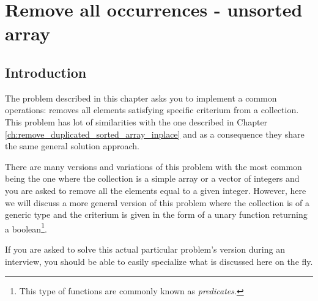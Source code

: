%



\chapter{Remove all occurrences -  unsorted array}
\label{ch:remove_all_occurrences_unsorted_array_inplace}
\section*{Introduction}
The problem described in this chapter asks you to implement a common operations: removes all
elements satisfying specific criterium from a collection. This problem has lot of similarities with
the one described in Chapter \ref{ch:remove_duplicated_sorted_array_inplace} and as a consequence
they share the same general solution approach. 

There are many versions and variations of this problem with the most common being the one where the
collection is a simple array or a vector of integers and you are asked to remove all the elements
equal to a given integer. However, here we will discuss a more general version of this problem where
the collection is of a generic type  and the criterium is given in the form of a unary
function returning a boolean\footnote{This type of functions are commonly known as
\textit{predicates}.}. 

If you are asked to solve this actual particular problem’s version during an interview, you should be able to easily specialize what is discussed here on the fly.


